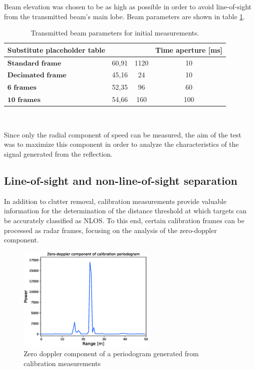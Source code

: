 Beam elevation was chosen to be as high as possible in order to avoid line-of-sight from the transmitted beam's main lobe. Beam parameters are shown in table \ref{table:Test1TXBeamParams}.


\begin{table}[H]
	\centering 
	\begin{tabular}{|p{9em} c c c |}
		\hline
		\rowcolor{bluepoli!40} %
		\textbf{Substitute placeholder table} & \textbf{} & \textbf{} & \textbf{Time aperture [ms]} \T\B \\
		\hline \hline
		$\textbf{Standard frame}$ & 60,91 & 1120 & 10 \T\B \\
		$\textbf{Decimated frame}$ & 45,16 & 24 & 10 \T\B\\
		$\textbf{6 frames}$ & 52,35 & 96 & 60  \T\B\\
		$\textbf{10 frames}$ & 54,66 & 160 & 100  \T\B\\
		
		\hline
	\end{tabular}
	\\[10pt]
	\caption{Transmitted beam parameters for initial measurements.}
	\label{table:Test1TXBeamParams}
\end{table}

Since only the radial component of speed can be measured, the aim of the test was to maximize this component in order to analyze the characteristics of the signal generated from the reflection.

\subsection{Line-of-sight and non-line-of-sight separation}

In addition to clutter removal, calibration measurements provide valuable information for the determination of the distance threshold at which targets can be accurately classified as NLOS. To this end, certain calibration frames can be processed as radar frames, focusing on the analysis of the zero-doppler component.
	
	
\begin{figure}
	\centering
	\includegraphics[width=0.6\textwidth]{Images/To-be-sorted/cali_static_per/cali_static_per.eps}
	\caption{Zero doppler component of a periodogram generated from calibration measurements}
	\label{fig:Test1_cali_static_per}
\end{figure}

